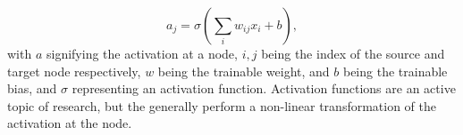 \begin{equation}
    a_{j} = \sigma \left(\sum_i w_{ij} x_{i} + b\right),
\end{equation}
with $a$ signifying the activation at a node, $i,j$ being the index of the source and target node respectively, $w$ being the trainable weight, and $b$ being the trainable bias, and $\sigma$ representing an activation function. Activation functions are an active topic of research, but the generally perform a non-linear transformation of the activation at the node.

\begin{figure}
    \centering
    \\

\end{figure}
